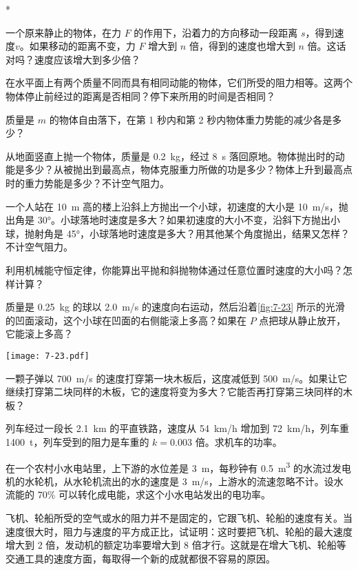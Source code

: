 \begin{Exercise}*
\begin{question}
  \item 一个原来静止的物体，在力 $F$ 的作用下，沿着力的方向移动一段距离 $s$，得到速度$v$。如果移动的距离不变，力 $F$ 增大到 $n$ 倍，得到的速度也增大到 $n$ 倍。这话对吗？速度应该增大到多少倍？
  \item 在水平面上有两个质量不同而具有相同动能的物体，它们所受的阻力相等。这两个物体停止前经过的距离是否相同？停下来所用的时间是否相同？
  \item 质量是 $m$ 的物体自由落下，在第 1 秒内和第 2 秒内物体重力势能的减少各是多少？
  \item 从地面竖直上抛一个物体，质量是 \qty{0.2}{kg}，经过 \qty{8}{s} 落回原地。物体抛出时的动能是多少？从被抛出到最高点，物体克服重力所做的功是多少？物体上升到最高点时的重力势能是多少？不计空气阻力。
  \item 一个人站在 \qty{10}{m} 高的楼上沿斜上方抛出一个小球，初速度的大小是 \qty{10}{m/s}，抛出角是 \ang{30}。小球落地时速度是多大？如果初速度的大小不变，沿斜下方抛出小球，抛射角是 \ang{45}，小球落地时速度是多大？用其他某个角度抛出，结果又怎样？不计空气阻力。
  \item 利用机械能守恒定律，你能算出平抛和斜抛物体通过任意位置时速度的大小吗？怎样计算？
  \item 质量是 \qty{0.25}{kg} 的球以 \qty{2.0}{m/s} 的速度向右运动，然后沿着\cref{fig:7-23} 所示的光滑的凹面滚动，这个小球在凹面的右侧能滚上多高？如果在 $P$ 点把球从静止放开，它能滚上多高？
  \begin{figurehere}
    \begin{minipage}{\linewidth}\centering
      \texttt{[image: 7-23.pdf]}
      \caption{}\label{fig:7-23}
    \end{minipage}
  \end{figurehere}
  \item  一颗子弹以 \qty{700}{m/s} 的速度打穿第一块木板后，这度减低到 \qty{500}{m/s}。如果让它继续打穿第二块同样的木板，它的速度将变为多大？它能否再打穿第三块同样的木板？
  \item  列车经过一段长 \qty{2.1}{km} 的平直铁路，速度从 \qty{54}{km/h} 增加到 \qty{72}{km/h}，列车重 \qty{1400}{t}，列车受到的阻力是车重的 $k=0.003$ 倍。求机车的功率。
  \item  在一个农村小水电站里，上下游的水位差是 \qty{3}{m}，每秒钟有 \qty{0.5}{m^3} 的水流过发电机的水轮机，从水轮机流出的水的速度是 \qty{3}{m/s}，上游水的流速忽略不计。设水流能的 70\% 可以转化成电能，求这个小水电站发出的电功率。
  \item  飞机、轮船所受的空气或水的阻力并不是固定的，它跟飞机、轮船的速度有关。当速度很大时，阻力与速度的平方成正比，试证明：这时要把飞机、轮船的最大速度增大到 2 倍，发动机的额定功率要增大到 8 倍才行。这就是在增大飞机、轮船等交通工具的速度方面，每取得一个新的成就都很不容易的原因。

\end{question}
\end{Exercise}
